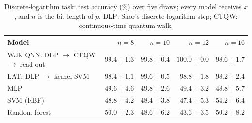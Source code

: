 \begin{table}[htbp]
\centering
\small
\setlength{\tabcolsep}{4pt}
\caption[Discrete-logarithm task: main comparison]{Discrete-logarithm task: test accuracy (\%) over five draws; every model receives $x$, and $n$ is the bit length of $p$. DLP: Shor's discrete-logarithm step; CTQW: continuous-time quantum walk.}
\label{tab:latmain}
\begin{tabular}{lrrrr}
\hline
Model & $n=8$ & $n=10$ & $n=12$ & $n=16$ \\
\hline
Walk QNN: DLP $\to$ CTQW $\to$ read-out & $99.4 \pm 1.3$ & $99.8 \pm 0.4$ & $100.0 \pm 0.0$ & $98.6 \pm 1.7$ \\
LAT: DLP $\to$ kernel SVM & $98.4 \pm 1.1$ & $99.6 \pm 0.5$ & $98.8 \pm 1.8$ & $98.2 \pm 2.4$ \\
MLP & $49.6 \pm 4.6$ & $49.8 \pm 2.6$ & $49.4 \pm 3.2$ & $48.8 \pm 5.7$ \\
SVM (RBF) & $48.8 \pm 4.2$ & $48.4 \pm 3.8$ & $47.4 \pm 5.3$ & $54.2 \pm 6.4$ \\
Random forest & $50.0 \pm 2.3$ & $48.6 \pm 6.2$ & $43.6 \pm 3.5$ & $50.2 \pm 8.2$ \\
\hline
\end{tabular}
\end{table}
